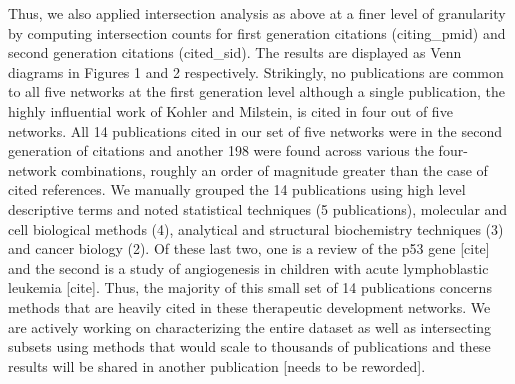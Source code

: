 \documentclass[10pt,letterpaper]{article}
\begin{document}
Thus, we also applied intersection analysis as above at a finer level of granularity by computing intersection counts for first generation citations (citing\_pmid) and second generation citations (cited\_sid). The results are displayed as Venn diagrams in Figures 1 and 2 respectively. Strikingly, no publications are common to all five networks at the first generation level although a single publication, the highly influential work of Kohler and Milstein\cite{bibKohler}, is cited in four out of five networks. All 14 publications cited in our set of five networks were in the second generation of citations and another 198 were found  across various the four-network combinations, roughly an order of magnitude greater than the case of cited references.  We manually grouped the 14 publications using high level descriptive terms and noted statistical techniques (5 publications), molecular and cell biological methods (4), analytical and structural biochemistry techniques (3) and cancer biology (2). Of these last two, one is a review of the p53 gene [cite] and the second is a study of angiogenesis in children with acute lymphoblastic leukemia [cite]. Thus, the majority of this small set of 14 publications concerns methods that are heavily cited in these therapeutic development networks. We are actively working on characterizing the entire dataset as well as intersecting subsets using methods that would scale to thousands of publications and these results will be shared in another publication [needs to be reworded].
\end{document}

